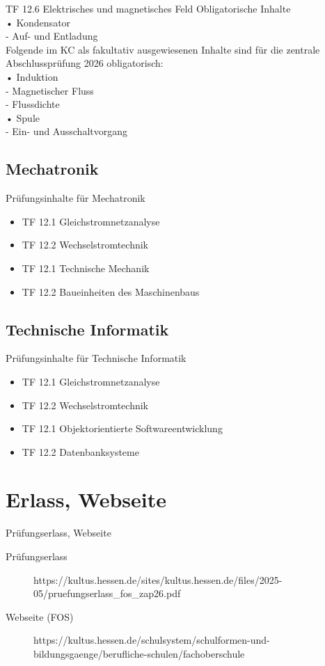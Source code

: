 \documentclass[aspectratio=169, ignorenonframetext]{beamer}
\begin{document}
  \begin{frame}{TF 12.6 Elektrisches und magnetisches Feld}
   Obligatorische Inhalte\\
• Kondensator\\
- Auf- und Entladung\\
Folgende im KC als fakultativ ausgewiesenen Inhalte sind für die zentrale Abschlussprüfung 2026 obligatorisch:\\
• Induktion\\
- Magnetischer Fluss\\
- Flussdichte\\
• Spule\\
- Ein- und Ausschaltvorgang
  \end{frame}

  \subsection{Mechatronik}
  \begin{frame}{Prüfungsinhalte für Mechatronik}
      \begin{itemize}
       \item TF 12.1 Gleichstromnetzanalyse
       \item TF 12.2 Wechselstromtechnik
       \item TF 12.1 Technische Mechanik
       \item TF 12.2 Baueinheiten des Maschinenbaus
      \end{itemize}
  \end{frame}

  \subsection{Technische Informatik}
  \begin{frame}{Prüfungsinhalte für Technische Informatik}
      \begin{itemize}
       \item TF 12.1 Gleichstromnetzanalyse
       \item TF 12.2 Wechselstromtechnik
       \item TF 12.1 Objektorientierte Softwareentwicklung
       \item TF 12.2 Datenbanksysteme
      \end{itemize}
  \end{frame}

\section{Erlass, Webseite}
\begin{frame}{Prüfungserlass, Webseite}
  \begin{description}
   \item[Prüfungserlass] https://kultus.hessen.de/sites/kultus.hessen.de/files/2025-05/pruefungserlass\_fos\_zap26.pdf
   \item[Webseite (FOS)] https://kultus.hessen.de/schulsystem/schulformen-und-bildungsgaenge/berufliche-schulen/fachoberschule
  \end{description}
\end{frame}

  \label{LastPage}
\end{document}
